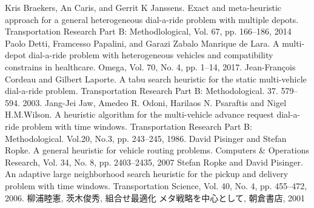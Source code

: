 \documentclass[uplatex]{ujreport}
\begin{document}
\begin{thebibliography}{99}
   Kris Braekers, An Caris, and Gerrit K Janssens. Exact and meta-heuristic approach for a general heterogeneous dial-a-ride problem with multiple depots. Transportation Research Part B: Methodlological, Vol. 67, pp. 166--186, 2014
   Paolo Detti, Framcesso Papalini, and Garazi Zabalo Manrique de Lara. A multi-depot dial-a-ride problem with heterogeneous vehicles and compatibility constrains in healthcare. Omega, Vol. 70, No. 4, pp. 1--14, 2017.
   Jean-François Cordeau and Gilbert Laporte. A tabu search heuristic for the static multi-vehicle dial-a-ride problem.
  Transportation Research Part B: Methodological. 37. 579--594. 2003.
   Jang-Jei Jaw, Amedeo R. Odoni, Harilaos N. Psaraftis and Nigel H.M.Wilson. A heuristic algorithm for the multi-vehicle advance request dial-a-ride problem with time windows. Transportation Research Part B: Methodological. Vol.20, No.3, pp. 243--245, 1986.
   David Pisinger and Stefan Ropke. A general heuristic for vehicle routing problems. Computers & Operations Research, Vol. 34, No. 8, pp. 2403--2435, 2007
  Stefan Ropke and David Pisinger. An adaptive large neighborhood search heuristic for the pickup and delivery problem with time windows. Transportation Science, Vol. 40, No. 4, pp. 455--472, 2006.
  柳浦睦憲, 茨木俊秀, 組合せ最適化 メタ戦略を中心として, 朝倉書店, 2001
\end{thebibliography}
\end{document}
